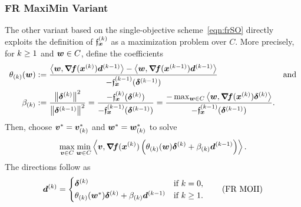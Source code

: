 \documentclass{article}
\theoremstyle{plain}
\theoremstyle{definition}
\begin{document}
\subsubsection*{FR MaxiMin Variant}
The other variant based on the single-objective 
scheme~\eqref{eqn:frSO} directly exploits
the definition of $\mathfrak{f}_{\bm{x}}^{(k)}$ as a maximization problem
over $C$.
More precisely, for $k \ge 1$ and $\bm{w}\in C$,
define the coefficients
\begin{equation}
	\begin{aligned}
	\theta_{(k)}(\bm{w})
	&:=
	\frac{
		\left\langle \bm{w}, \bm{\nabla}\!\bm{f}(\bm{x}^{(k)})\bm{d}^{(k-1)} \right\rangle
		-
		\left\langle \bm{w}, \bm{\nabla}\!\bm{f}(\bm{x}^{(k-1)})\bm{d}^{(k-1)} \right\rangle
	}{
		-\mathfrak{f}_{\bm{x}}^{(k-1)}(\bm{\delta}^{(k-1)})
	}
	&\text{and}
	\\
	\beta_{(k)}
	&:=
	\frac{\left\|\bm{\delta}^{(k)}\right\|^2}{\left\|\bm{\delta}^{(k-1)}\right\|^2}
	=
	\frac{
		- \mathfrak{f}_{\bm{x}}^{(k)}(\bm{\delta}^{(k)})
	}{
		- \mathfrak{f}_{\bm{x}}^{(k-1)}(\bm{\delta}^{(k-1)})
	}
	=
	\frac{
		- \max_{\bm{w}\in C}
			\left\langle \bm{w}, \bm{\nabla}\!\bm{f}(\bm{x}^{(k)})\bm{\delta}^{(k)} \right\rangle
	}{
		-\mathfrak{f}_{\bm{x}}^{(k-1)}(\bm{\delta}^{(k-1)})
	}
	.
	\end{aligned}
	\label{eqn:characteriserAbout}
\end{equation}
Then, choose $\bm{v}^* = \bm{v}_{(k)}^*$ 
and $\bm{w}^* = \bm{w}_{(k)}^*$ to solve
\begin{equation}
	\max_{\bm{v}\in C}
	\min_{\bm{w}\in C}
	\left\langle \bm{v}, 
		\bm{\nabla}\!\bm{f}(\bm{x}^{(k)})
		\left(
			\theta_{(k)}(\bm{w})
			\bm{\delta}^{(k)}
			+
			\beta_{(k)}
			\bm{d}^{(k-1)}
		\right)
	 \right\rangle
	.
	\label{eqn:doorsAttention}
\end{equation}
The directions follow as
\begin{equation}
	\bm{d}^{(k)} =
	\begin{cases}
		\bm{\delta}^{(k)}
		&\text{if $k=0$},
		\\
		\theta_{(k)}(\bm{w}^*)
			\bm{\delta}^{(k)}
			+
			\beta_{(k)}
			\bm{d}^{(k-1)}
		&\text{if $k \geq 1$.}
	\end{cases}
	\tag{FR~MOII}
	\label{eqn:frMO2}
\end{equation}
\end{document}
